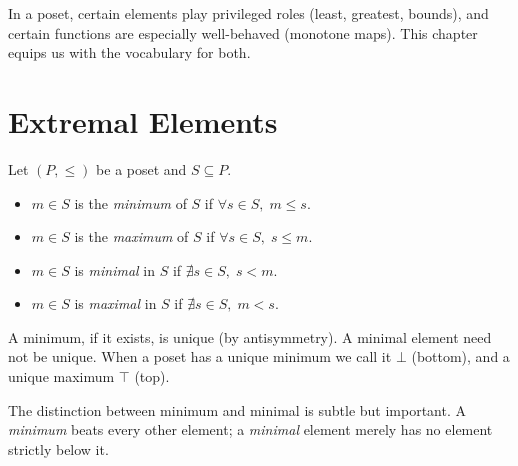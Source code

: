 \documentclass[12pt, a4paper, openright]{book}
\theoremstyle{thmstyle}
\theoremstyle{defstyle}
\newenvironment{defbox}[1][]{%
  \begin{tcolorbox}[defbox, title={Definition\ifx\\#1\\\else\ --- #1\fi}]%
}{\end{tcolorbox}}
\begin{document}
In a poset, certain elements play privileged roles (least, greatest, bounds),
and certain functions are especially well-behaved (monotone maps).
This chapter equips us with the vocabulary for both.

\section{Extremal Elements}

\begin{defbox}[Minimum, Maximum, Minimal, Maximal]
  Let $(P, \leq)$ be a poset and $S \subseteq P$.
  \begin{itemize}[nosep]
    \item $m \in S$ is the \emph{minimum} of $S$ if $\forall s \in S,\; m \leq s$.
    \item $m \in S$ is the \emph{maximum} of $S$ if $\forall s \in S,\; s \leq m$.
    \item $m \in S$ is \emph{minimal} in $S$ if $\nexists s \in S,\; s < m$.
    \item $m \in S$ is \emph{maximal} in $S$ if $\nexists s \in S,\; m < s$.
  \end{itemize}
\end{defbox}

A minimum, if it exists, is unique (by antisymmetry). A minimal element need
not be unique. When a poset has a unique minimum we call it $\bot$ (bottom),
and a unique maximum $\top$ (top).

The distinction between minimum and minimal is subtle but important.
A \emph{minimum} beats every other element; a \emph{minimal} element
merely has no element strictly below it.
\end{document}
